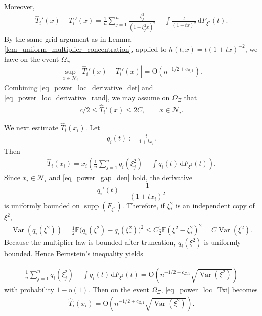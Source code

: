 \documentclass[12pt]{article}
\theoremstyle{plain}
\numberwithin{equation}{section}
\begin{document}
Moreover,
\begin{align*}
	\widehat{T}_i'(x)-T_i'(x)
	=
	\frac{1}{n}\sum_{j=1}^n\frac{\xi_j^2}{(1+\xi_j^2x)^2}
	-
	\int\frac{t}{(1+t x)^2}\,\mathrm{d}F_{\xi^2}(t).
\end{align*}
By the same grid argument as in Lemma \ref{lem_uniform_multiplier_concentration}, applied to $h(t,x)=t(1+t x)^{-2}$, we have on the event $\Omega_{\Xi}$
\begin{align}\label{eq_power_loc_derivative_rand}
	\sup_{x\in\mathcal N_i}
	|\widehat{T}_i'(x)-T_i'(x)|
	=
	\mathrm{O}(n^{-1/2+c_{\Xi,1}}).
\end{align}
Combining \eqref{eq_power_loc_derivative_det} and \eqref{eq_power_loc_derivative_rand}, we may assume on $\Omega_{\Xi}$ that
\begin{align}\label{eq_power_loc_derivative_hat}
	c/2\le \widehat{T}_i'(x)\le 2C,\qquad x\in\mathcal N_i.
\end{align}

We next estimate $\widehat{T}_i(x_i)$. Let
\begin{align*}
	q_i(t):=\frac{t}{1+t x_i}.
\end{align*}
Then
\begin{align}\label{eq_power_loc_Txi}
	\widehat{T}_i(x_i)
	=
	x_i\left(
	\frac{1}{n}\sum_{j=1}^n q_i(\xi_j^2)-\int q_i(t)\,\mathrm{d}F_{\xi^2}(t)
	\right).
\end{align}
Since $x_i\in\mathcal N_i$ and \eqref{eq_power_gap_den} hold, the derivative
\[
q_i'(t)=\frac{1}{(1+t x_i)^2}
\]
is uniformly bounded on $\operatorname{supp}(F_{\xi^2})$. Therefore, if $\xi_*^2$ is an independent copy of $\xi^2$,
\begin{align*}
	\operatorname{Var}(q_i(\xi^2))
	=
	\frac{1}{2}\mathbb E\big(q_i(\xi^2)-q_i(\xi_*^2)\big)^2
	\le
	C\frac{1}{2}\mathbb E(\xi^2-\xi_*^2)^2
	=
	C\operatorname{Var}(\xi^2).
\end{align*}
Because the multiplier law is bounded after truncation, $q_i(\xi^2)$ is uniformly bounded. Hence Bernstein's inequality yields

\begin{align}\label{eq_power_loc_q}
	\frac{1}{n}\sum_{j=1}^n q_i(\xi_j^2)-\int q_i(t)\,\mathrm{d}F_{\xi^2}(t)
	=
	\mathrm{O}\!\left(n^{-1/2+c_{\Xi,1}}\sqrt{\operatorname{Var}(\xi^2)}\right)
\end{align}
with probability $1-\mathrm{o}(1)$. Then on the event $\Omega_{\Xi}$, \eqref{eq_power_loc_Txi} becomes
\begin{align}\label{eq_power_loc_Tsmall}
	\widehat{T}_i(x_i)
	=
	\mathrm{O}\!\left(n^{-1/2+c_{\Xi,1}}\sqrt{\operatorname{Var}(\xi^2)}\right).
\end{align}
\end{document}
